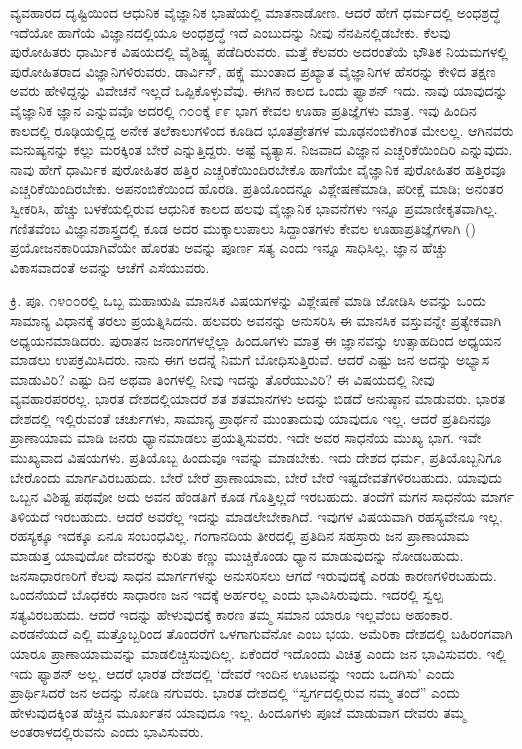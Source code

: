 ವ್ಯವಹಾರದ ದೃಷ್ಟಿಯಿಂದ ಆಧುನಿಕ ವೈಜ್ಞಾನಿಕ ಭಾಷೆಯಲ್ಲಿ ಮಾತನಾಡೋಣ. ಆದರೆ ಹೇಗೆ ಧರ್ಮದಲ್ಲಿ ಅಂಧಶ್ರದ್ಧೆ ಇದೆಯೋ ಹಾಗೆಯೆ ವಿಜ್ಞಾನದಲ್ಲಿಯೂ ಅಂಧಶ್ರದ್ಧೆ ಇದೆ ಎಂಬುದನ್ನು ನೀವು ನೆನಪಿನಲ್ಲಿಡಬೇಕು. ಕೆಲವು ಪುರೋಹಿತರು ಧಾರ್ಮಿಕ ವಿಷಯದಲ್ಲಿ ವೈಶಿಷ್ಟ್ಯ ಪಡೆದಿರುವರು. ಮತ್ತೆ ಕೆಲವರು ಅದರಂತೆಯೆ ಭೌತಿಕ ನಿಯಮಗಳಲ್ಲಿ ಪುರೋಹಿತರಾದ ವಿಜ್ಞಾನಿಗಳಿರುವರು. ಡಾರ್ವಿನ್, ಹಕ್ಸ್ಲೆ ಮುಂತಾದ ಪ್ರಖ್ಯಾತ ವೈಜ್ಞಾನಿಗಳ ಹೆಸರನ್ನು ಕೇಳಿದ ತಕ್ಷಣ ಅವರು ಹೇಳಿದ್ದನ್ನು ವಿವೇಚನೆ ಇಲ್ಲದೆ ಒಪ್ಪಿಕೊಳ್ಳುವೆವು. ಈಗಿನ ಕಾಲದ ಒಂದು ಫ್ಯಾಶನ್ ಇದು. ನಾವು ಯಾವುದನ್ನು ವೈಜ್ಞಾನಿಕ ಜ್ಞಾನ ಎನ್ನುವವೊ ಅದರಲ್ಲಿ ೧೦೦ಕ್ಕೆ ೯೯ ಭಾಗ ಕೇವಲ ಊಹಾ ಪ್ರತಿಜ್ಞೆಗಳು ಮಾತ್ರ. ಇವು ಹಿಂದಿನ ಕಾಲದಲ್ಲಿ ರೂಢಿಯಲ್ಲಿದ್ದ ಅನೇಕ ತಲೆಕಾಲುಗಳಿಂದ ಕೂಡಿದ ಭೂತಪ್ರೇತಗಳ ಮೂಢನಂಬಿಕೆಗಿಂತ ಮೇಲಲ್ಲ. ಆಗಿನವರು ಮನುಷ್ಯನನ್ನು ಕಲ್ಲು ಮರಕ್ಕಿಂತ ಬೇರೆ ಎನ್ನುತ್ತಿದ್ದರು. ಅಷ್ಟೆ ವ್ಯತ್ಯಾಸ. ನಿಜವಾದ ವಿಜ್ಞಾನ ಎಚ್ಚರಿಕೆಯಿಂದಿರಿ ಎನ್ನುವುದು. ನಾವು ಹೇಗೆ ಧಾರ್ಮಿಕ ಪುರೋಹಿತರ ಹತ್ತಿರ ಎಚ್ಚರಿಕೆಯಿಂದಿರಬೇಕೊ ಹಾಗೆಯೇ ವೈಜ್ಞಾನಿಕ ಪುರೋಹಿತರ ಹತ್ತಿರವೂ ಎಚ್ಚರಿಕೆಯಿಂದಿರಬೇಕು. ಅಪನಂಬಿಕೆಯಿಂದ ಹೊರಡಿ. ಪ್ರತಿಯೊಂದನ್ನೂ ವಿಶ್ಲೇಷಣೆಮಾಡಿ, ಪರೀಕ್ಷೆ ಮಾಡಿ; ಅನಂತರ ಸ್ವೀಕರಿಸಿ, ಹೆಚ್ಚು ಬಳಕೆಯಲ್ಲಿರುವ ಆಧುನಿಕ ಕಾಲದ ಹಲವು ವೈಜ್ಞಾನಿಕ ಭಾವನೆಗಳು ಇನ್ನೂ ಪ್ರಮಾಣೀಕೃತವಾಗಿಲ್ಲ. ಗಣಿತವೆಂಬ ವಿಜ್ಞಾನಶಾಸ್ತ್ರದಲ್ಲಿ ಕೂಡ ಅದರ ಮುಕ್ಕಾಲುಪಾಲು ಸಿದ್ದಾಂತಗಳು ಕೇವಲ ಊಹಾಪ್ರತಿಜ್ಞೆಗಳಾಗಿ () ಪ್ರಯೋಜನಕಾರಿಯಾಗಿವೆಯೇ ಹೊರತು ಅವನ್ನು ಪೂರ್ಣ ಸತ್ಯ ಎಂದು ಇನ್ನೂ ಸಾಧಿಸಿಲ್ಲ. ಜ್ಞಾನ ಹೆಚ್ಚು ವಿಕಾಸವಾದಂತೆ ಅವನ್ನು ಆಚೆಗೆ ಎಸೆಯುವರು.

ಕ್ರಿ. ಪೂ. ೧೪೦೦ರಲ್ಲಿ ಒಬ್ಬ ಮಹಾಋಷಿ ಮಾನಸಿಕ ವಿಷಯಗಳನ್ನು ವಿಶ್ಲೇಷಣೆ ಮಾಡಿ ಜೋಡಿಸಿ ಅವನ್ನು ಒಂದು ಸಾಮಾನ್ಯ ವಿಧಾನಕ್ಕೆ ತರಲು ಪ್ರಯತ್ನಿಸಿದನು. ಹಲವರು ಅವನನ್ನು ಅನುಸರಿಸಿ ಈ ಮಾನಸಿಕ ವಸ್ತುವನ್ನೇ ಪ್ರತ್ಯೇಕವಾಗಿ ಅಧ್ಯಯನಮಾಡಿದರು. ಪುರಾತನ ಜನಾಂಗಗಳಲ್ಲೆಲ್ಲಾ ಹಿಂದೂಗಳು ಮಾತ್ರ ಈ ಜ್ಞಾನವನ್ನು ಉತ್ಸಾಹದಿಂದ ಅಧ್ಯಯನ ಮಾಡಲು ಉಪಕ್ರಮಿಸಿದರು. ನಾನು ಈಗ ಅದನ್ನೆ ನಿಮಗೆ ಬೋಧಿಸುತ್ತಿರುವೆ. ಆದರೆ ಎಷ್ಟು ಜನ ಅದನ್ನು ಅಭ್ಯಾಸ ಮಾಡುವಿರಿ? ಎಷ್ಟು ದಿನ ಅಥವಾ ತಿಂಗಳಲ್ಲಿ ನೀವು ಇದನ್ನು ತೊರೆಯುವಿರಿ? ಈ ವಿಷಯದಲ್ಲಿ ನೀವು ವ್ಯವಹಾರಪರರಲ್ಲ. ಭಾರತ ದೇಶದಲ್ಲಿಯಾದರೆ ಶತ ಶತಮಾನಗಳು ಅದನ್ನು ಬಿಡದೆ ಅನುಷ್ಠಾನ ಮಾಡುವರು. ಭಾರತ ದೇಶದಲ್ಲಿ ಇಲ್ಲಿರುವಂತೆ ಚರ್ಚುಗಳು, ಸಾಮಾನ್ಯ ಪ್ರಾರ್ಥನೆ ಮುಂತಾದುವು ಯಾವುದೂ ಇಲ್ಲ. ಆದರೆ ಪ್ರತಿದಿನವೂ ಪ್ರಾಣಾಯಾಮ ಮಾಡಿ ಜನರು ಧ್ಯಾನಮಾಡಲು ಪ್ರಯತ್ನಿಸುವರು. ಇದೇ ಅವರ ಸಾಧನೆಯ ಮುಖ್ಯ ಭಾಗ. ಇವೇ ಮುಖ್ಯವಾದ ವಿಷಯಗಳು. ಪ್ರತಿಯೊಬ್ಬ ಹಿಂದುವೂ ಇವನ್ನು ಮಾಡಬೇಕು. ಇದು ದೇಶದ ಧರ್ಮ, ಪ್ರತಿಯೊಬ್ಬನಿಗೂ ಬೇರೊಂದು ಮಾರ್ಗವಿರಬಹುದು. ಬೇರೆ ಬೇರೆ ಪ್ರಾಣಾಯಾಮ, ಬೇರೆ ಬೇರೆ ಇಷ್ಟದೇವತೆಗಳಿರಬಹುದು. ಯಾವುದು ಒಬ್ಬನ ವಿಶಿಷ್ಟ ಪಥವೋ ಅದು ಅವನ ಹೆಂಡತಿಗೆ ಕೂಡ ಗೊತ್ತಿಲ್ಲದೆ ಇರಬಹುದು. ತಂದೆಗೆ ಮಗನ ಸಾಧನೆಯ ಮಾರ್ಗ ತಿಳಿಯದೆ ಇರಬಹುದು. ಆದರೆ ಅವರೆಲ್ಲ ಇದನ್ನು ಮಾಡಲೇಬೇಕಾಗಿದೆ. ಇವುಗಳ ವಿಷಯವಾಗಿ ರಹಸ್ಯವೇನೂ ಇಲ್ಲ. ರಹಸ್ಯಕ್ಕೂ ಇದಕ್ಕೂ ಏನೂ ಸಂಬಂಧವಿಲ್ಲ. ಗಂಗಾನದಿಯ ತೀರದಲ್ಲಿ ಪ್ರತಿದಿನ ಸಹಸ್ರಾರು ಜನ ಪ್ರಾಣಾಯಾಮ ಮಾಡುತ್ತ ಯಾವುದೋ ದೇವರನ್ನು ಕುರಿತು ಕಣ್ಣು ಮುಚ್ಚಿಕೊಂಡು ಧ್ಯಾನ ಮಾಡುವುದನ್ನು ನೋಡಬಹುದು. ಜನಸಾಧಾರಣರಿಗೆ ಕೆಲವು ಸಾಧನ ಮಾರ್ಗಗಳನ್ನು ಅನುಸರಿಸಲು ಆಗದೆ ಇರುವುದಕ್ಕೆ ಎರಡು ಕಾರಣಗಳಿರಬಹುದು. ಒಂದನೆಯದೆ ಬೊಧಕರು ಸಾಧಾರಣ ಜನ ಇದಕ್ಕೆ ಅರ್ಹರಲ್ಲ ಎಂದು ಭಾವಿಸಿರುವುದು. ಇದರಲ್ಲಿ ಸ್ವಲ್ಪ ಸತ್ಯವಿರಬಹುದು. ಆದರೆ ಇದನ್ನು ಹೇಳುವುದಕ್ಕೆ ಕಾರಣ ತಮ್ಮ ಸಮಾನ ಯಾರೂ ಇಲ್ಲವೆಂಬ ಅಹಂಕಾರ. ಎರಡನೆಯದೆ ಎಲ್ಲಿ ಮತ್ತೊಬ್ಬರಿಂದ ತೊಂದರೆಗೆ ಒಳಗಾಗುವೆನೋ ಎಂಬ ಭಯ. ಅಮೆರಿಕಾ ದೇಶದಲ್ಲಿ ಬಹಿರಂಗವಾಗಿ ಯಾರೂ ಪ್ರಾಣಾಯಾಮವನ್ನು ಮಾಡಲಿಚ್ಚಿಸುವುದಿಲ್ಲ. ಏಕೆಂದರೆ ಇದೊಂದು ವಿಚಿತ್ರ ಎಂದು ಜನ ಭಾವಿಸುವರು. ಇಲ್ಲಿ ಇದು ಫ್ಯಾಶನ್ ಅಲ್ಲ. ಆದರೆ ಭಾರತ ದೇಶದಲ್ಲಿ `ದೇವರೆ ಇಂದಿನ ಊಟವನ್ನು ಇಂದು ಒದಗಿಸು' ಎಂದು ಪ್ರಾರ್ಥಿಸಿದರೆ ಜನ ಅದನ್ನು ನೋಡಿ ನಗುವರು. ಭಾರತ ದೇಶದಲ್ಲಿ “ಸ್ವರ್ಗದಲ್ಲಿರುವ ನಮ್ಮ ತಂದೆ'' ಎಂದು ಹೇಳುವುದಕ್ಕಿಂತ ಹೆಚ್ಚಿನ ಮೂರ್ಖತನ ಯಾವುದೂ ಇಲ್ಲ. ಹಿಂದೂಗಳು ಪೂಜೆ ಮಾಡುವಾಗ ದೇವರು ತಮ್ಮ ಅಂತರಾಳದಲ್ಲಿರುವನು ಎಂದು ಭಾವಿಸುವರು.

